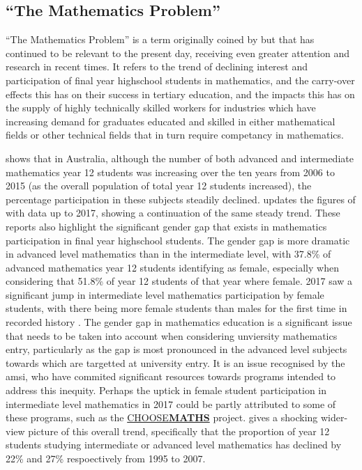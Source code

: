 \documentclass[twoside,12pt,a4paper]{report}
\begin{document}
\subsection{``The Mathematics Problem''}

``The Mathematics Problem'' is a term originally coined by  but that has continued to be relevant to the present day, receiving even greater attention and research in recent times. It refers to the trend of declining interest and participation of final year highschool students in mathematics, and the carry-over effects this has on their success in tertiary education, and the impacts this has on the supply of highly technically skilled workers for industries which have increasing demand for graduates educated and skilled in either mathematical fields or other technical fields that in turn require competancy in mathematics.

 shows that in Australia, although the number of both advanced and intermediate mathematics year 12 students was increasing over the ten years from 2006 to 2015 (as the overall population of total year 12 students increased), the percentage participation in these subjects steadily declined.  updates the figures of  with data up to 2017, showing a continuation of the same steady trend. These reports also highlight the significant gender gap that exists in mathematics participation in final year highschool students. The gender gap is more dramatic in advanced level mathematics than in the intermediate level, with 37.8\% of advanced mathematics year 12 students identifying as female, especially when considering that 51.8\% of year 12 students of that year where female. 2017 saw a significant jump in intermediate level mathematics participation by female students, with there being more female students than males for the first time in recorded history \cite{James2019}. The gender gap in mathematics education is a significant issue that needs to be taken into account when considering unviersity mathematics entry, particularly as the gap is most pronounced in the advanced level subjects towards which are targetted at university entry. It is an issue recognised by the \gls{amsi}, who have commited significant resources towards programs intended to address this inequity. Perhaps the uptick in female student participation in intermediate level mathematics in 2017 could be partly attributed to some of these programs, such as the \href{https://choosemaths.org.au/}{CHOOSE\textbf{MATHS}} project. \cite{Brown2009} gives a shocking wider-view picture of this overall trend, specifically that the proportion of year 12 students studying intermediate or advanced level mathematics has declined by 22\% and 27\% respoectively from 1995 to 2007. 
\end{document}
